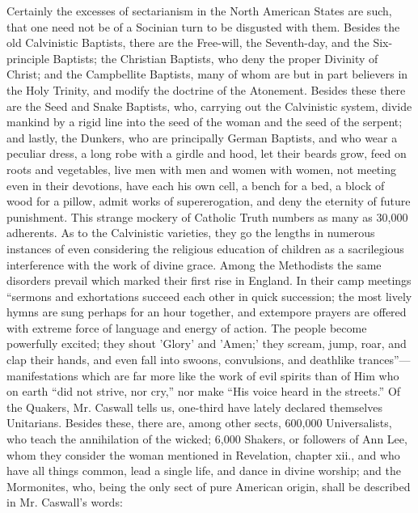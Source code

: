 Certainly the excesses of sectarianism in the
North American States are such, that one need not be of a Socinian
turn to be disgusted with them. Besides the old Calvinistic Baptists,
there are the Free-will, the Seventh-day, and the Six-principle
Baptists; the Christian Baptists, who deny the proper Divinity of
Christ; and the Campbellite Baptists, many of whom are but in part
believers in the Holy Trinity, and modify the doctrine of the
Atonement. Besides these there are the Seed and Snake Baptists, who,
carrying out the Calvinistic system, divide mankind by a rigid line
into the seed of the woman and the seed of the serpent; and lastly,
the Dunkers, who are principally German Baptists, and who wear a
peculiar dress, a long robe with a girdle and hood, let their beards
grow, feed on roots and vegetables, live men with men and women with
women, not meeting even in their devotions, have each his own cell, a
bench for a bed, a block of wood for a pillow, admit works of
supererogation, and deny the eternity of future punishment. This
strange mockery of Catholic Truth numbers as many as 30,000 adherents.
As to the Calvinistic varieties, they go the lengths in numerous
instances of even considering the religious education of children as a
sacrilegious interference with the work of divine grace. Among the
Methodists the same disorders prevail which marked their first rise in
England. In their camp meetings ``sermons and exhortations succeed each
other in quick succession; the most lively hymns are sung perhaps for
an hour together, and extempore prayers are offered with extreme force
of language and energy of action. The people become powerfully
excited; they shout 'Glory' and 'Amen;' they scream, jump, roar, and
clap their hands, and even fall into swoons, convulsions, and
deathlike trances''—manifestations which are far more like the work
of evil spirits than of Him who on earth ``did not strive, nor cry,''
nor make ``His voice heard in the streets.'' Of the Quakers, Mr. Caswall
tells us, one-third have lately declared themselves Unitarians.
Besides these, there are, among other sects, 600,000 Universalists,
who teach the annihilation of the wicked; 6,000 Shakers, or followers
of Ann Lee, whom they consider the woman mentioned in Revelation,
chapter xii., and who have all things common, lead a single life, and
dance in divine worship; and the Mormonites, who, being the only sect
of pure American origin, shall be described in Mr. Caswall's words:

